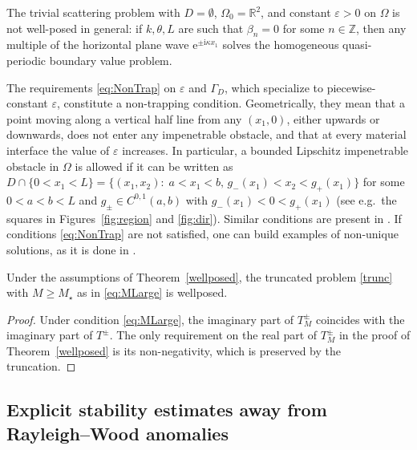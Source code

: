 \documentclass[a4paper,10pt]{article}
\newcommand{\IR}{{\mathbb R}}
\newcommand{\IZ}{{\mathbb Z}}
\newcommand{\ri}{{\mathrm i}}
\newcommand{\re}{{\mathrm e}}
\newcommand{\GD}{{\Gamma_D}}
\begin{document}
The trivial scattering problem with $D=\emptyset$, $\Omega_0=\IR^2$, and constant $\varepsilon>0$ on $\Omega$ is not well-posed in general: if $k,\theta, L$ are such that $\beta_n=0$ for some $n\in\IZ$, then any multiple of the horizontal plane wave $\re^{\pm\ri\kappa x_1}$ solves the homogeneous quasi-periodic boundary value problem.


The requirements \eqref{eq:NonTrap} on $\varepsilon$ and $\GD$, which specialize \cite[eq.~(3.34)]{BonnetBD1994} to piecewise-constant $\varepsilon$, constitute a non-trapping condition. 
Geometrically, they mean that a point moving along a vertical half line from any $(x_1,0)$, either upwards or downwards, does not enter any impenetrable obstacle, and that at every material interface the value of $\varepsilon$ increases.
In particular, a bounded Lipschitz impenetrable obstacle in $\Omega$ is allowed if it 
can be written as $D\cap\{0<x_1<L\}=\{(x_1,x_2):\;a<x_1<b,\, g_-(x_1)<x_2<g_+(x_1)\}$ for some $0<a<b<L$ and $g_\pm\in C^{0,1}(a,b)$ with $g_-(x_1)<0<g_+(x_1)$ (see e.g.\ the squares in Figures~\ref{fig:region} and \ref{fig:dir}).
Similar conditions are present in \cite[Theorem~1]{Civiletti2020}. If conditions \eqref{eq:NonTrap} are not satisfied, one can build examples of non-unique solutions, as it is done in \cite[\S5]{BonnetBD1994}.


{\begin{corol}\label{cor:TruncWP}
	Under the assumptions of Theorem~\ref{wellposed}, the truncated problem \eqref{trunc} with $M\ge M_\star$ as in \eqref{eq:MLarge} is wellposed.
\end{corol}
\begin{proof}
	Under condition \eqref{eq:MLarge}, the imaginary part of $T^\pm_M$ coincides with the imaginary part of $T^\pm$.
	The only requirement on the real part of $T^\pm_M$ in the proof of Theorem~\ref{wellposed} is its non-negativity, which is preserved by the truncation.
\end{proof}
}

\subsection{Explicit stability estimates away from Rayleigh--Wood anomalies} 
\end{document}
